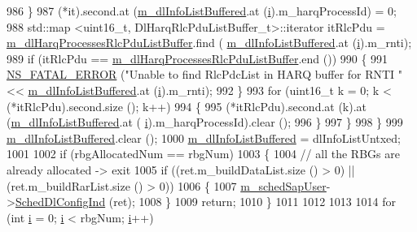 \begin{DoxyCode}
986             \}
987           (*it).second.at (\hyperlink{classns3_1_1FdMtFfMacScheduler_ac7f5da1ae0cf374d49f379b07c2c78a7}{m\_dlInfoListBuffered}.at (\hyperlink{bernuolliDistribution_8m_a6f6ccfcf58b31cb6412107d9d5281426}{i}).m\_harqProcessId) = 0;
988           std::map <uint16\_t, DlHarqRlcPduListBuffer\_t>::iterator itRlcPdu =  
      \hyperlink{classns3_1_1FdMtFfMacScheduler_a156b4cd10f41dd79e446a42c469fee02}{m\_dlHarqProcessesRlcPduListBuffer}.find (
      \hyperlink{classns3_1_1FdMtFfMacScheduler_ac7f5da1ae0cf374d49f379b07c2c78a7}{m\_dlInfoListBuffered}.at (\hyperlink{bernuolliDistribution_8m_a6f6ccfcf58b31cb6412107d9d5281426}{i}).m\_rnti);
989           \textcolor{keywordflow}{if} (itRlcPdu == \hyperlink{classns3_1_1FdMtFfMacScheduler_a156b4cd10f41dd79e446a42c469fee02}{m\_dlHarqProcessesRlcPduListBuffer}.end ())
990             \{
991               \hyperlink{group__fatal_ga5131d5e3f75d7d4cbfd706ac456fdc85}{NS\_FATAL\_ERROR} (\textcolor{stringliteral}{"Unable to find RlcPdcList in HARQ buffer for RNTI "} << 
      \hyperlink{classns3_1_1FdMtFfMacScheduler_ac7f5da1ae0cf374d49f379b07c2c78a7}{m\_dlInfoListBuffered}.at (\hyperlink{bernuolliDistribution_8m_a6f6ccfcf58b31cb6412107d9d5281426}{i}).m\_rnti);
992             \}
993           \textcolor{keywordflow}{for} (uint16\_t k = 0; k < (*itRlcPdu).second.size (); k++)
994             \{
995               (*itRlcPdu).second.at (k).at (\hyperlink{classns3_1_1FdMtFfMacScheduler_ac7f5da1ae0cf374d49f379b07c2c78a7}{m\_dlInfoListBuffered}.at (
      \hyperlink{bernuolliDistribution_8m_a6f6ccfcf58b31cb6412107d9d5281426}{i}).m\_harqProcessId).clear ();
996             \}
997         \}
998     \}
999   \hyperlink{classns3_1_1FdMtFfMacScheduler_ac7f5da1ae0cf374d49f379b07c2c78a7}{m\_dlInfoListBuffered}.clear ();
1000   \hyperlink{classns3_1_1FdMtFfMacScheduler_ac7f5da1ae0cf374d49f379b07c2c78a7}{m\_dlInfoListBuffered} = dlInfoListUntxed;
1001 
1002   \textcolor{keywordflow}{if} (rbgAllocatedNum == rbgNum)
1003     \{
1004       \textcolor{comment}{// all the RBGs are already allocated -> exit}
1005       \textcolor{keywordflow}{if} ((ret.m\_buildDataList.size () > 0) || (ret.m\_buildRarList.size () > 0))
1006         \{
1007           \hyperlink{classns3_1_1FdMtFfMacScheduler_ac856cbc41e5ac4e78562686fd29ba873}{m\_schedSapUser}->\hyperlink{classns3_1_1FfMacSchedSapUser_a28f8484af5a32a45ee6c0e51770d83f7}{SchedDlConfigInd} (ret);
1008         \}
1009       \textcolor{keywordflow}{return};
1010     \}
1011 
1012 
1013 
1014   \textcolor{keywordflow}{for} (\textcolor{keywordtype}{int} \hyperlink{bernuolliDistribution_8m_a6f6ccfcf58b31cb6412107d9d5281426}{i} = 0; \hyperlink{bernuolliDistribution_8m_a6f6ccfcf58b31cb6412107d9d5281426}{i} < rbgNum; \hyperlink{bernuolliDistribution_8m_a6f6ccfcf58b31cb6412107d9d5281426}{i}++)

\end{DoxyCode}
